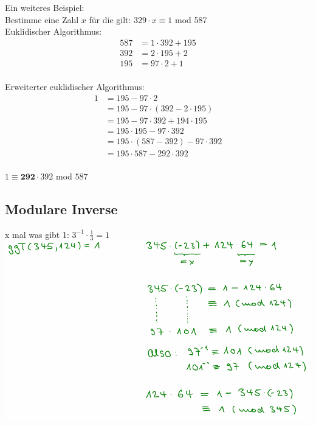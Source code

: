 \documentclass[12pt]{scrartcl}
\begin{document}
Ein weiteres Beispiel:\\
Bestimme eine Zahl $x$ für die gilt: $329 \cdot x \equiv 1$ mod 587\\

Euklidischer Algorithmus:\\
\begin{align*}
    587 &= 1 \cdot 392 + 195 \\
    392 &= 2 \cdot 195 + 2 \\
    195 &= 97 \cdot 2 + 1 \\
\end{align*}

\newpage
Erweiterter euklidischer Algorithmus:\\
\begin{align*}
    1   &= 195 - 97 \cdot 2 \\
        &= 195 - 97 \cdot (392 - 2 \cdot 195)\\
        &= 195 - 97 \cdot 392 + 194 \cdot 195\\
        &= 195 \cdot 195 - 97 \cdot 392\\
        &= 195 \cdot (587 - 392) - 97 \cdot 392\\
        &= 195 \cdot 587 - 292 \cdot 392\\
\end{align*}

$1 \equiv \mathbf{292} \cdot 392$ mod $587$\\

\subsection{Modulare Inverse}
x mal was gibt 1: $3^{-1} \cdot \frac{1}{3} = 1$\\

\includegraphics[width=14cm]{img/modulo inverse_beispiel.png}
\end{document}

